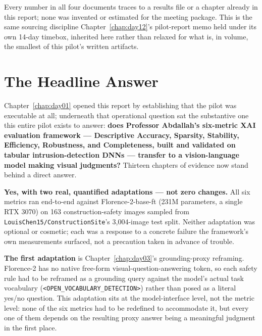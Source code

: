 Every number in all four documents traces to a results file or a chapter already in this
report; none was invented or estimated for the meeting package. This is the same sourcing
discipline Chapter~\ref{chap:day12}'s pilot-report memo held under its own 14-day timebox,
inherited here rather than relaxed for what is, in volume, the smallest of this pilot's written
artifacts.

\section{The Headline Answer}
\label{sec:day14-headline}

Chapter~\ref{chap:day01} opened this report by establishing that the pilot was executable at
all; underneath that operational question sat the substantive one this entire pilot exists to
answer: \textbf{does Professor Abdallah's six-metric XAI evaluation framework --- Descriptive
Accuracy, Sparsity, Stability, Efficiency, Robustness, and Completeness, built and validated on
tabular intrusion-detection DNNs --- transfer to a vision-language model making visual
judgments?} Thirteen chapters of evidence now stand behind a direct answer.

\textbf{Yes, with two real, quantified adaptations --- not zero changes.} All six metrics ran
end-to-end against Florence-2-base-ft (231M parameters, a single RTX 3070) on 163
construction-safety images sampled from \texttt{LouisChen15/ConstructionSite}'s 3,004-image
test split. Neither adaptation was optional or cosmetic; each was a response to a concrete
failure the framework's own measurements surfaced, not a precaution taken in advance of trouble.

\textbf{The first adaptation} is Chapter~\ref{chap:day03}'s grounding-proxy reframing.
Florence-2 has no native free-form visual-question-answering token, so each safety rule had to
be reframed as a grounding query against the model's actual task vocabulary
(\texttt{<OPEN\_VOCABULARY\_DETECTION>}) rather than posed as a literal yes/no question. This
adaptation sits at the model-interface level, not the metric level: none of the six metrics had
to be redefined to accommodate it, but every one of them depends on the resulting proxy answer
being a meaningful judgment in the first place.

